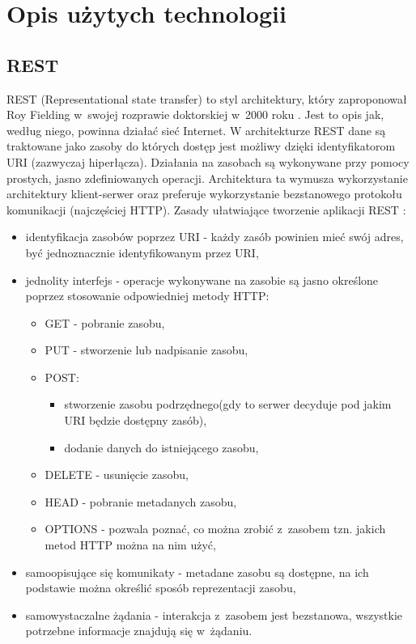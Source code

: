 \section{Opis użytych technologii}

\subsection{REST}
REST (Representational state transfer) to styl architektury, który zaproponował Roy Fielding w~swojej rozprawie doktorskiej w~2000 roku \cite{rest_Roy}. Jest to opis jak, według niego, powinna działać sieć Internet. W architekturze REST dane są traktowane jako zasoby do których dostęp jest możliwy dzięki identyfikatorom URI (zazwyczaj hiperłącza). Działania na zasobach są wykonywane przy pomocy prostych, jasno zdefiniowanych operacji. Architektura ta wymusza wykorzystanie architektury klient-serwer oraz preferuje wykorzystanie bezstanowego protokołu komunikacji (najczęściej HTTP). Zasady ułatwiające tworzenie aplikacji REST \cite{rest_book}:
\begin{itemize}
	\item identyfikacja zasobów poprzez URI - każdy zasób powinien mieć swój
                adres, być jednoznacznie
                identyfikowanym przez URI,
	\item jednolity interfejs - operacje wykonywane na zasobie są jasno
                określone poprzez stosowanie odpowiedniej metody HTTP:
	\begin{itemize}
		\item GET - pobranie zasobu,
		\item PUT - stworzenie lub nadpisanie zasobu,
                \item POST:
                \begin{itemize}
			\item stworzenie zasobu podrzędnego(gdy to serwer decyduje pod jakim URI będzie dostępny zasób),
			\item dodanie danych do istniejącego zasobu,
		\end{itemize} 
		\item DELETE - usunięcie zasobu,
		\item HEAD - pobranie metadanych zasobu,
		\item OPTIONS - pozwala poznać, co można zrobić z~zasobem tzn. jakich metod HTTP można na nim użyć,
	\end{itemize}
	\item samoopisujące się komunikaty - metadane zasobu są dostępne, na ich podstawie można określić sposób reprezentacji zasobu,
	\item samowystaczalne żądania - interakcja z~zasobem jest bezstanowa, wszystkie potrzebne informacje znajdują się w~żądaniu.
\end{itemize}

